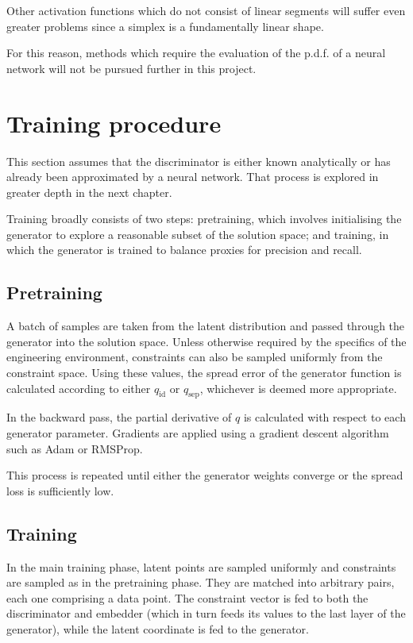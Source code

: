 \documentclass[../../main.tex]{subfiles}
\begin{document}
Other activation functions which do not consist of linear segments will suffer even greater problems since a simplex is a fundamentally linear shape.

For this reason, methods which require the evaluation of the p.d.f. of a neural network will not be pursued further in this project.

\section{Training procedure}

This section assumes that the discriminator is either known analytically or has already been approximated by a neural network.
That process is explored in greater depth in the next chapter.

Training broadly consists of two steps: pretraining, which involves initialising the generator to explore a reasonable subset of the solution space; and training, in which the generator is trained to balance proxies for precision and recall.

\subsection{Pretraining}

A batch of samples are taken from the latent distribution and passed through the generator into the solution space.
Unless otherwise required by the specifics of the engineering environment, constraints can also be sampled uniformly from the constraint space.
Using these values, the spread error of the generator function is calculated according to either $q_\text{id}$ or $q_\text{sep}$, whichever is deemed more appropriate.

In the backward pass, the partial derivative of $q$ is calculated with respect to each generator parameter.
Gradients are applied using a gradient descent algorithm such as Adam or RMSProp.

This process is repeated until either the generator weights converge or the spread loss is sufficiently low.

\subsection{Training}

In the main training phase, latent points are sampled uniformly and constraints are sampled as in the pretraining phase.
They are matched into arbitrary pairs, each one comprising a data point.
The constraint vector is fed to both the discriminator and embedder (which in turn feeds its values to the last layer of the generator), while the latent coordinate is fed to the generator.
\end{document}
